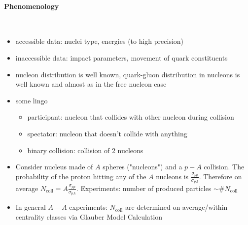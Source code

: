 \paragraph*{Phenomenology}\mbox{}\\
\begin{itemize}
    \item accessible data: nuclei type, energies (to high precision)
    \item inaccessible data: impact parameters, movement of quark constituents
    \item nucleon distribution is well known, quark-gluon distribution in nucleons is well known and almost as in the free nucleon case
    \item some lingo
          \begin{itemize}
              \item participant: nucleon that collides with other nucleon during collision
              \item spectator: nucleon that doesn't collide with anything
              \item binary collision: collision of 2 nucleons
          \end{itemize}
    \item Consider nucleus made of $A$ spheres ("nucleons") and a $p-A$ collision. The probability of the proton hitting any of the $A$ nucleons is $\frac{\sigma_{pp}}{\sigma_{pA}}$. Therefore on average $N_{\text{coll}}=A\frac{\sigma_{pp}}{\sigma_{pA}}$. Experiments: number of produced particles $\sim\# N_{\text{coll}}$
    \item In general $A-A$ experiments: $N_{\text{coll}}$ are determined on-average/within centrality classes via Glauber Model Calculation
\end{itemize}